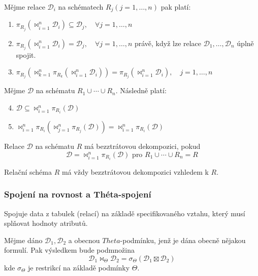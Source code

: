 \begin{upquote}
Mějme relace $\mathcal{D}_{i}$ na schématech $R_{j} (j=1, \dots , n)$ pak platí:
\begin{enumerate}
\item $\pi_{R_{j}} (\Join_{i = 1}^{n} \mathcal{D}_{i}) \subseteq \mathcal{D}_{j}, \quad \forall j = 1, \ldots, n$
\item $\pi_{R_{j}} (\Join_{i = 1}^{n} \mathcal{D}_{i}) = \mathcal{D}_{j}, \quad \forall j = 1, \ldots, n$ právě, když lze relace $\mathcal{D}_{1}, \ldots, \mathcal{D}_{n}$ úplně spojit.
\item $\pi_{R_{j}} (\Join_{k = 1}^{n} \pi_{R_{k}} (\Join_{i = 1}^{n} \mathcal{D}_{i})) = \pi_{R_{j}} (\Join_{i = 1}^{n} \mathcal{D}_{i}), \quad j = 1, \ldots, n$
\end{enumerate}
Mějme $\mathcal{D}$ na schématu $R_{1} \cup \cdots \cup R_{n}$. Následně platí:
\begin{enumerate}
\setcounter{enumi}{3}
\item $\mathcal{D} \subseteq \Join_{i = 1}^{n} \pi_{R_{i}} (\mathcal{D})$
\item $\Join_{i = 1}^{n} \pi_{R_{i}} (\Join_{j = 1}^{n} \pi_{R_{j}} (\mathcal{D})) = \Join_{i = 1}^{n} \pi_{R_{i}} (\mathcal{D}) $
\end{enumerate}
\end{upquote}
\begin{uptheorem}
Relace $\mathcal{D}$ na schématu $R$ má bezztrátovou dekompozici, pokud
$$
\mathcal{D} = \Join_{i = 1}^{n} \pi_{R_{i}} (\mathcal{D}) \text{ pro } R_{1} \cup \cdots \cup R_{n} = R
$$
\end{uptheorem}
\begin{upnote}
Relační schéma $R$ má vždy bezztrátovou dekompozici vzhledem k $R$.
\end{upnote}

\subsubsection{Spojení na rovnost a Théta-spojení}
Spojuje data z tabulek (relací) na základě specifikovaného vztahu, který musí splňovat hodnoty atributů.

Mějme dáno $\mathcal{D}_{1}, \mathcal{D}_{2}$ a obecnou $Theta$-podmínku, jenž je dána obecně nějakou formulí. Pak výsledkem bude podmnožina
$$
\mathcal{D}_{1} \Join_{\Theta} \mathcal{D}_{2} = \sigma_{\Theta} (\mathcal{D}_{1} \boxtimes \mathcal{D}_{2})
$$
kde $\sigma_{\Theta}$ je restrikcí na základě podmínky $\Theta$.

